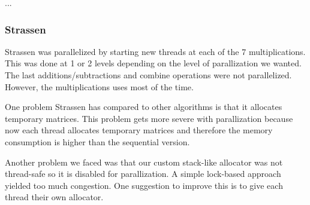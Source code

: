 ...


\subsubsection{Strassen}

Strassen was parallelized by starting new threads at each of the 7 multiplications. This was done at 1 or 2 levels depending on the level of parallization we wanted. The last additions/subtractions and combine operations were not parallelized. However, the multiplications uses most of the time.

One problem Strassen has compared to other algorithms is that it allocates temporary matrices. This problem gets more severe with parallization because now each thread allocates temporary matrices and therefore the memory consumption is higher than the sequential version.

Another problem we faced was that our custom stack-like allocator was not thread-safe so it is disabled for parallization. A simple lock-based approach yielded too much congestion. One suggestion to improve this is to give each thread their own allocator.

